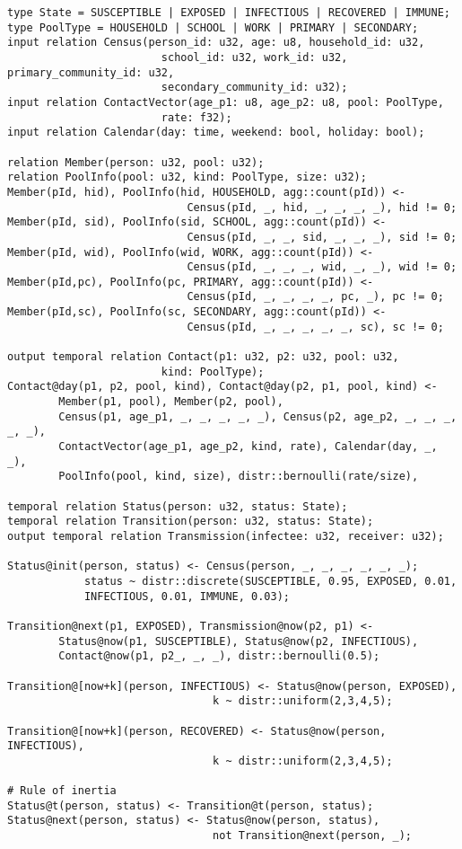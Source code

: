 \begin{lstlisting}[float, caption={Stride use case.}, label={epiq:use_case}]
type State = SUSCEPTIBLE | EXPOSED | INFECTIOUS | RECOVERED | IMMUNE;
type PoolType = HOUSEHOLD | SCHOOL | WORK | PRIMARY | SECONDARY;
input relation Census(person_id: u32, age: u8, household_id: u32, 	
					    school_id: u32, work_id: u32, primary_community_id: u32, 
					    secondary_community_id: u32);
input relation ContactVector(age_p1: u8, age_p2: u8, pool: PoolType,
                        rate: f32);
input relation Calendar(day: time, weekend: bool, holiday: bool);

relation Member(person: u32, pool: u32);
relation PoolInfo(pool: u32, kind: PoolType, size: u32);
Member(pId, hid), PoolInfo(hid, HOUSEHOLD, agg::count(pId)) <-
                            Census(pId, _, hid, _, _, _, _), hid != 0;
Member(pId, sid), PoolInfo(sid, SCHOOL, agg::count(pId)) <-
                            Census(pId, _, _, sid, _, _, _), sid != 0;
Member(pId, wid), PoolInfo(wid, WORK, agg::count(pId)) <-
                            Census(pId, _, _, _, wid, _, _), wid != 0;
Member(pId,pc), PoolInfo(pc, PRIMARY, agg::count(pId)) <-
                            Census(pId, _, _, _, _, pc, _), pc != 0;
Member(pId,sc), PoolInfo(sc, SECONDARY, agg::count(pId)) <-
                            Census(pId, _, _, _, _, _, sc), sc != 0;

output temporal relation Contact(p1: u32, p2: u32, pool: u32,
                        kind: PoolType);
Contact@day(p1, p2, pool, kind), Contact@day(p2, p1, pool, kind) <-
        Member(p1, pool), Member(p2, pool), 
        Census(p1, age_p1, _, _, _, _, _), Census(p2, age_p2, _, _, _, _, _),
        ContactVector(age_p1, age_p2, kind, rate), Calendar(day, _, _),
        PoolInfo(pool, kind, size), distr::bernoulli(rate/size),

temporal relation Status(person: u32, status: State);
temporal relation Transition(person: u32, status: State);
output temporal relation Transmission(infectee: u32, receiver: u32);

Status@init(person, status) <- Census(person, _, _, _, _, _, _);
            status ~ distr::discrete(SUSCEPTIBLE, 0.95, EXPOSED, 0.01,
            INFECTIOUS, 0.01, IMMUNE, 0.03);

Transition@next(p1, EXPOSED), Transmission@now(p2, p1) <-
        Status@now(p1, SUSCEPTIBLE), Status@now(p2, INFECTIOUS),
        Contact@now(p1, p2_, _, _), distr::bernoulli(0.5);

Transition@[now+k](person, INFECTIOUS) <- Status@now(person, EXPOSED),
                                k ~ distr::uniform(2,3,4,5);

Transition@[now+k](person, RECOVERED) <- Status@now(person, INFECTIOUS),
                                k ~ distr::uniform(2,3,4,5);

# Rule of inertia
Status@t(person, status) <- Transition@t(person, status);
Status@next(person, status) <- Status@now(person, status),
                                not Transition@next(person, _);
\end{lstlisting}

